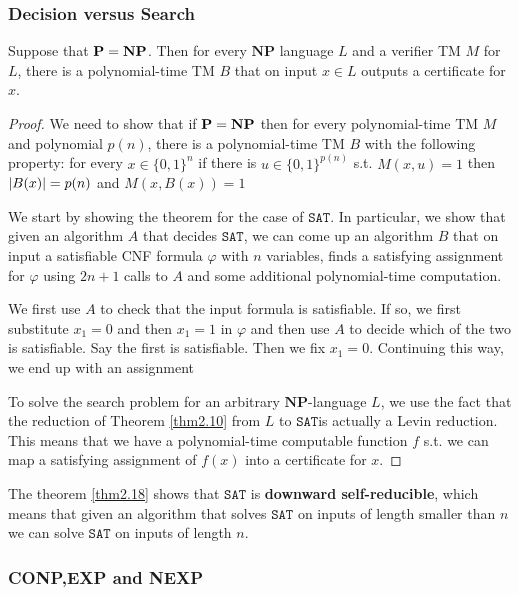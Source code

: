 \documentclass[11pt]{article}
\def \NP {\textbf{NP}}
\def \NP {\textbf{NP}}
\def \SAT {\texttt{SAT}}
\begin{document}
\subsubsection{Decision versus Search}
\label{sec:org6623626}
\begin{theorem}[]
\label{thm2.18}
Suppose that \(\bP=\NP\). Then for every \(\NP\) language \(L\) and a verifier TM \(M\)
for \(L\), there is a polynomial-time TM \(B\) that on input \(x\in L\) outputs a certificate
for \(x\).
\end{theorem}

\begin{proof}
We need to show that if \(\bP=\NP\) then for every polynomial-time TM \(M\) and
polynomial \(p(n)\), there is a polynomial-time TM \(B\) with the following property: for every
\(x\in\{0,1\}^n\) if there is \(u\in\{0,1\}^{p(n)}\) s.t. \(M(x,u)=1\) then \(\abs{B(x)}=p(n)\)
and \(M(x,B(x))=1\)

We start by showing the theorem for the case of \(\SAT\). In particular, we show that given an
algorithm \(A\) that decides \(\SAT\), we can come up an algorithm \(B\) that on input a
satisfiable CNF formula \(\varphi\) with \(n\) variables, finds a satisfying assignment for \(\varphi\)
using \(2n+1\) calls to \(A\) and some additional polynomial-time computation.

We first use \(A\) to check that the input formula is satisfiable. If so, we first
substitute \(x_1=0\) and then \(x_1=1\) in \(\varphi\) and then use \(A\) to decide which of the two is
satisfiable. Say the first is satisfiable. Then we fix \(x_1=0\). Continuing this way, we end
up with an assignment

To solve the search problem for an arbitrary \(\NP\)-language \(L\), we use the fact that the
reduction of Theorem \ref{thm2.10} from \(L\) to \(\SAT\)is actually a Levin reduction. This
means that we have a polynomial-time computable function \(f\) s.t. we can map a satisfying
assignment of \(f(x)\) into a certificate for \(x\).
\end{proof}

The theorem \ref{thm2.18} shows that \(\SAT\) is \textbf{downward self-reducible}, which means that
given an algorithm that solves \(\SAT\) on inputs of length smaller than \(n\) we can
solve \(\SAT\) on inputs of length \(n\).

\subsubsection{\textbf{CONP,EXP} and \textbf{NEXP}}
\label{sec:org9889929}
\end{document}

